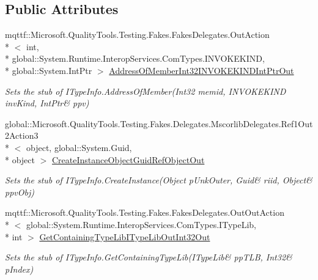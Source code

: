 \subsection*{Public Attributes}
\begin{DoxyCompactItemize}
\item 
mqttf\-::\-Microsoft.\-Quality\-Tools.\-Testing.\-Fakes.\-Fakes\-Delegates.\-Out\-Action\\*
$<$ int, \\*
global\-::\-System.\-Runtime.\-Interop\-Services.\-Com\-Types.\-I\-N\-V\-O\-K\-E\-K\-I\-N\-D, \\*
global\-::\-System.\-Int\-Ptr $>$ \hyperlink{class_system_1_1_runtime_1_1_interop_services_1_1_com_types_1_1_fakes_1_1_stub_i_type_info_a11bfa39a0103d0bb64696328033c5406}{Address\-Of\-Member\-Int32\-I\-N\-V\-O\-K\-E\-K\-I\-N\-D\-Int\-Ptr\-Out}
\begin{DoxyCompactList}\small\item\em Sets the stub of I\-Type\-Info.\-Address\-Of\-Member(Int32 memid, I\-N\-V\-O\-K\-E\-K\-I\-N\-D inv\-Kind, Int\-Ptr\& ppv)\end{DoxyCompactList}\item 
global\-::\-Microsoft.\-Quality\-Tools.\-Testing.\-Fakes.\-Delegates.\-Mscorlib\-Delegates.\-Ref1\-Out2\-Action3\\*
$<$ object, global\-::\-System.\-Guid, \\*
object $>$ \hyperlink{class_system_1_1_runtime_1_1_interop_services_1_1_com_types_1_1_fakes_1_1_stub_i_type_info_af2702df286f27c96fbf46f316ad38f01}{Create\-Instance\-Object\-Guid\-Ref\-Object\-Out}
\begin{DoxyCompactList}\small\item\em Sets the stub of I\-Type\-Info.\-Create\-Instance(Object p\-Unk\-Outer, Guid\& riid, Object\& ppv\-Obj)\end{DoxyCompactList}\item 
mqttf\-::\-Microsoft.\-Quality\-Tools.\-Testing.\-Fakes.\-Fakes\-Delegates.\-Out\-Out\-Action\\*
$<$ global\-::\-System.\-Runtime.\-Interop\-Services.\-Com\-Types.\-I\-Type\-Lib, \\*
int $>$ \hyperlink{class_system_1_1_runtime_1_1_interop_services_1_1_com_types_1_1_fakes_1_1_stub_i_type_info_a1b287a7f8211c887c65ba6fae5b555eb}{Get\-Containing\-Type\-Lib\-I\-Type\-Lib\-Out\-Int32\-Out}
\begin{DoxyCompactList}\small\item\em Sets the stub of I\-Type\-Info.\-Get\-Containing\-Type\-Lib(I\-Type\-Lib\& pp\-T\-L\-B, Int32\& p\-Index)\end{DoxyCompactList}\item 

\end{DoxyCompactItemize}
